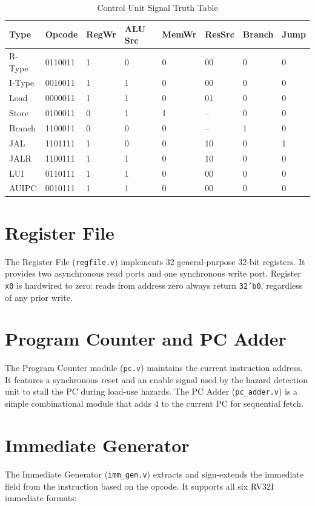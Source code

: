 \documentclass[12pt,a4paper]{report}
\begin{document}
\begin{table}[h!]
\centering
\caption{Control Unit Signal Truth Table}
\label{tab:control}
\begin{tabular}{L{2.0cm} C{1.5cm} C{1.2cm} C{1.2cm} C{1.2cm} C{1.5cm} C{1.2cm} C{1.2cm}}
    \toprule
    \textbf{Type} & \textbf{Opcode} & \textbf{RegWr} & \textbf{ALU Src} &
    \textbf{MemWr} & \textbf{ResSrc} & \textbf{Branch} & \textbf{Jump} \\
    \midrule
    R-Type    & 0110011 & 1 & 0 & 0 & 00 & 0 & 0 \\
    I-Type    & 0010011 & 1 & 1 & 0 & 00 & 0 & 0 \\
    Load      & 0000011 & 1 & 1 & 0 & 01 & 0 & 0 \\
    Store     & 0100011 & 0 & 1 & 1 & -- & 0 & 0 \\
    Branch    & 1100011 & 0 & 0 & 0 & -- & 1 & 0 \\
    JAL       & 1101111 & 1 & 0 & 0 & 10 & 0 & 1 \\
    JALR      & 1100111 & 1 & 1 & 0 & 10 & 0 & 0 \\
    LUI       & 0110111 & 1 & 1 & 0 & 00 & 0 & 0 \\
    AUIPC     & 0010111 & 1 & 1 & 0 & 00 & 0 & 0 \\
    \bottomrule
\end{tabular}
\end{table}

\section{Register File}
The Register File (\texttt{regfile.v}) implements 32 general-purpose 32-bit registers.
It provides two asynchronous read ports and one synchronous write port. Register
\texttt{x0} is hardwired to zero: reads from address zero always return
\texttt{32'b0}, regardless of any prior write.

\section{Program Counter and PC Adder}
The Program Counter module (\texttt{pc.v}) maintains the current instruction address.
It features a synchronous reset and an enable signal used by the hazard detection unit
to stall the PC during load-use hazards. The PC Adder (\texttt{pc\_adder.v}) is a
simple combinational module that adds 4 to the current PC for sequential fetch.

\section{Immediate Generator}
The Immediate Generator (\texttt{imm\_gen.v}) extracts and sign-extends the immediate
field from the instruction based on the opcode. It supports all six RV32I immediate
formats:
\end{document}
